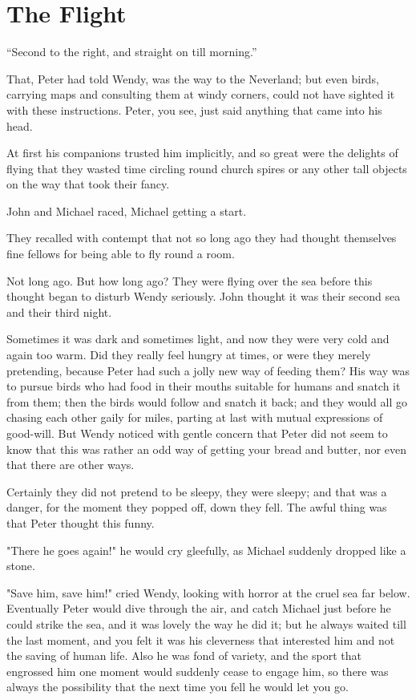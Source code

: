 
\chapter{The Flight}

\begin{center}
“Second to the right, and straight on till morning.”
\end{center}
That, Peter had told Wendy, was the way to the Neverland;
but even birds, carrying maps and consulting them at windy corners,
could not have sighted it with these instructions.
Peter, you see, just said anything that came into his head.

At first his companions trusted him implicitly,
and so great were the delights of flying
that they wasted time circling round church spires or any other tall objects on the way that took their fancy.

John and Michael raced, Michael getting a start.

They recalled with contempt that not so long ago they had thought themselves fine fellows
for being able to fly round a room.

Not long ago.
But how long ago?
They were flying over the sea before this thought began to disturb Wendy seriously.
John thought it was their second sea and their third night.

Sometimes it was dark and sometimes light,
and now they were very cold and again too warm.
Did they really feel hungry at times, or were they merely pretending,
because Peter had such a jolly new way of feeding them?
His way was to pursue birds who had food in their mouths suitable for humans and snatch it from them;
then the birds would follow and snatch it back;
and they would all go chasing each other gaily for miles,
parting at last with mutual expressions of good-will.
But Wendy noticed with gentle concern
that Peter did not seem to know that this was rather an odd way of getting your bread and butter,
nor even that there are other ways.

Certainly they did not pretend to be sleepy, they were sleepy;
and that was a danger, for the moment they popped off, down they fell.
The awful thing was that Peter thought this funny.

"There he goes again!\@" he would cry gleefully, as Michael suddenly dropped like a stone.

"Save him, save him!\@" cried Wendy, looking with horror at the cruel sea far below.
Eventually Peter would dive through the air, and catch Michael just before he could strike the sea,
and it was lovely the way he did it;
but he always waited till the last moment,
and you felt it was his cleverness that interested him and not the saving of human life.
Also he was fond of variety, and the sport that engrossed him one moment would suddenly cease to engage him,
so there was always the possibility that the next time you fell he would let you go.

